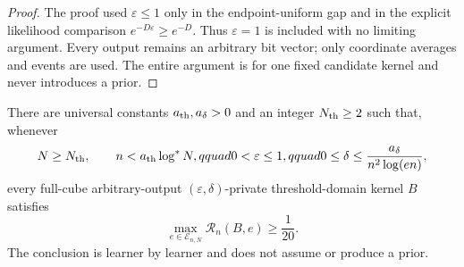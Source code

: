 \begin{proof}
The proof used \(\varepsilon\le 1\) only in the endpoint-uniform gap and in the explicit likelihood comparison \(e^{-D \varepsilon}\ge e^{-D}\). Thus \(\varepsilon=1\) is included with no limiting argument. Every output remains an arbitrary bit vector; only coordinate averages and events are used. The entire argument is for one fixed candidate kernel and never introduces a prior.

\end{proof}

\begin{proposition}
\label{prop:step-004-result}
There are universal constants $a_{\rm th},a_\delta>0$ and an integer
$N_{\rm th}\geq2$ such that, whenever
\[
N\geq N_{\rm th},\qquad n<a_{\rm th}\log^*N,qquad
0<\varepsilon\leq1,qquad
0\leq\delta\leq\frac{a_\delta}{n^2\log(en)},
\]
every full-cube arbitrary-output $(\varepsilon,\delta)$-private
threshold-domain kernel $B$ satisfies
\[
\max_{e\in\mathcal E_{n,N}}\mathcal R_n(B,e)\geq\frac1{20}.
\]
The conclusion is learner by learner and does not assume or produce a
prior.
\end{proposition}
